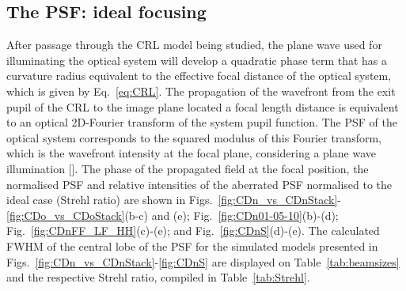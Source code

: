 \begin{refsection}
\subsection{The PSF: ideal focusing}\label{sec:psf_sim}

After passage through the CRL model being studied, the plane wave used for illuminating the optical system will develop a quadratic phase term that has a curvature radius equivalent to the effective focal distance of the optical system, which is given by Eq.~\ref{eq:CRL}. The propagation of the wavefront from the exit pupil of the CRL to the image plane located a focal length distance is equivalent to an optical 2D-Fourier transform of the system pupil function. The PSF of the optical system corresponds to the squared modulus of this Fourier transform, which is the wavefront intensity at the focal plane, considering a plane wave illumination [\cite[\textit{\S2.3.1} \& \textit{\S6.2}]{Goodman2017}]. The phase of the propagated field at the focal position, the normalised PSF and relative intensities of the aberrated PSF normalised to the ideal case (Strehl ratio) are shown in Figs.~\ref{fig:CDn_vs_CDnStack}-\ref{fig:CDo_vs_CDoStack}(b-c) and (e);  Fig.~\ref{fig:CDn01-05-10}(b)-(d); Fig.~\ref{fig:CDnFF_LF_HH}(c)-(e); and Fig.~\ref{fig:CDnS}(d)-(e). The calculated FWHM of the central lobe of the PSF for the simulated models presented in Figs.~\ref{fig:CDn_vs_CDnStack}-\ref{fig:CDnS} are displayed on Table~\ref{tab:beamsizes} and the respective Strehl ratio, compiled in Table~\ref{tab:Strehl}.



\end{refsection}
